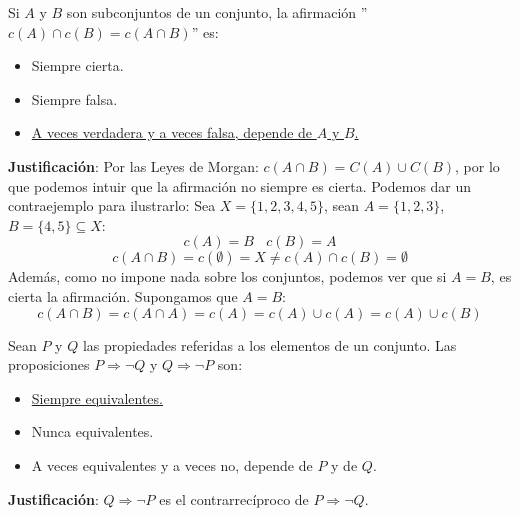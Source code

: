 \documentclass[12pt]{article}
\newcounter{ejercicio}[section] %
\newcounter{ejercicio}
\begin{document}
    \begin{ejercicio}
        Si $A$ y $B$ son subconjuntos de un conjunto, la afirmación \newline ''$c(A) \cap c(B) = c(A \cap B)$'' es:
        \begin{itemize}
            \item Siempre cierta.
            \item Siempre falsa.
            \item \underline{A veces verdadera y a veces falsa, depende de $A$ y $B$.}
        \end{itemize}

        \noindent
        \textbf{Justificación}:
        Por las Leyes de Morgan: $c(A \cap B) = C(A) \cup C(B)$, por lo que podemos intuir que la afirmación no siempre es cierta. Podemos dar un contraejemplo para ilustrarlo:\newline
        Sea $X = \{1,2,3,4,5\}$, sean $A = \{1,2,3\}$, $B = \{4,5\} \subseteq X$:
        $$c(A) = B~~~~c(B) = A$$
        $$c(A \cap B) = c(\emptyset) = X \neq c(A) \cap c(B) = \emptyset$$
        Además, como no impone nada sobre los conjuntos, podemos ver que si $A = B$, es cierta la afirmación. Supongamos que $A = B$:
        $$c(A \cap B) = c(A \cap A) = c(A) = c(A) \cup c(A) = c(A) \cup c(B)$$

    \end{ejercicio}

    \newpage
    \begin{ejercicio}
        Sean $P$ y $Q$ las propiedades referidas a los elementos de un conjunto. Las proposiciones $P \Rightarrow \neg Q$ y $Q \Rightarrow \neg P$ son:
        \begin{itemize}
            \item \underline{Siempre equivalentes.}
            \item Nunca equivalentes.
            \item A veces equivalentes y a veces no, depende de $P$ y de $Q$.
        \end{itemize}

        \noindent
        \textbf{Justificación}:
        $Q \Rightarrow \neg P$ es el contrarrecíproco de $P \Rightarrow \neg Q$.
    \end{ejercicio}
\end{document}
